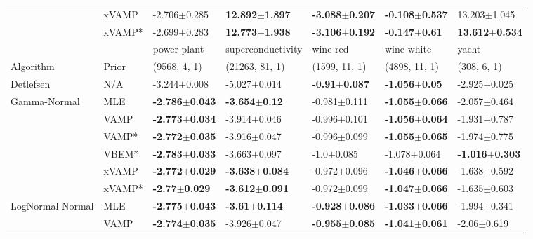 \begin{tabular}{lllllll}
                 & xVAMP &          -2.706$\pm$0.285 &  \textbf{12.892$\pm$1.897} &  \textbf{-3.088$\pm$0.207} &  \textbf{-0.108$\pm$0.537} &           13.203$\pm$1.045 \\
                 & xVAMP* &          -2.699$\pm$0.283 &  \textbf{12.773$\pm$1.938} &  \textbf{-3.106$\pm$0.192} &   \textbf{-0.147$\pm$0.61} &  \textbf{13.612$\pm$0.534} \\
\midrule
                 &        &                power plant &          superconductivity &                   wine-red &                 wine-white &                      yacht \\
Algorithm & Prior& (9568, 4, 1)& (21263, 81, 1)& (1599, 11, 1)& (4898, 11, 1)& (308, 6, 1)\\
\midrule
Detlefsen & N/A &           -3.244$\pm$0.008 &           -5.027$\pm$0.014 &   \textbf{-0.91$\pm$0.087} &   \textbf{-1.056$\pm$0.05} &           -2.925$\pm$0.025 \\
Gamma-Normal & MLE &  \textbf{-2.786$\pm$0.043} &   \textbf{-3.654$\pm$0.12} &           -0.981$\pm$0.111 &  \textbf{-1.055$\pm$0.066} &           -2.057$\pm$0.464 \\
                 & VAMP &  \textbf{-2.773$\pm$0.034} &           -3.914$\pm$0.046 &           -0.996$\pm$0.101 &  \textbf{-1.056$\pm$0.064} &           -1.931$\pm$0.787 \\
                 & VAMP* &  \textbf{-2.772$\pm$0.035} &           -3.916$\pm$0.047 &           -0.996$\pm$0.099 &  \textbf{-1.055$\pm$0.065} &           -1.974$\pm$0.775 \\
                 & VBEM* &  \textbf{-2.783$\pm$0.033} &           -3.663$\pm$0.097 &             -1.0$\pm$0.085 &           -1.078$\pm$0.064 &  \textbf{-1.016$\pm$0.303} \\
                 & xVAMP &  \textbf{-2.772$\pm$0.029} &  \textbf{-3.638$\pm$0.084} &           -0.972$\pm$0.096 &  \textbf{-1.046$\pm$0.066} &           -1.638$\pm$0.592 \\
                 & xVAMP* &   \textbf{-2.77$\pm$0.029} &  \textbf{-3.612$\pm$0.091} &           -0.972$\pm$0.099 &  \textbf{-1.047$\pm$0.066} &           -1.635$\pm$0.603 \\
LogNormal-Normal & MLE &  \textbf{-2.775$\pm$0.043} &   \textbf{-3.61$\pm$0.114} &  \textbf{-0.928$\pm$0.086} &  \textbf{-1.033$\pm$0.066} &           -1.994$\pm$0.341 \\
                 & VAMP &  \textbf{-2.774$\pm$0.035} &           -3.926$\pm$0.047 &  \textbf{-0.955$\pm$0.085} &  \textbf{-1.041$\pm$0.061} &            -2.06$\pm$0.619 \\

\end{tabular}
